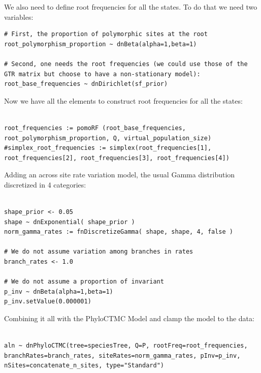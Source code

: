\documentclass[11pt]{article}
\begin{document}
{\begin{framed}
We also need to define root frequencies for all the states.
To do that we need two variables:

 {\tt \begin{snugshade*}
\begin{lstlisting}
# First, the proportion of polymorphic sites at the root
root_polymorphism_proportion ~ dnBeta(alpha=1,beta=1)

# Second, one needs the root frequencies (we could use those of the GTR matrix but choose to have a non-stationary model):
root_base_frequencies ~ dnDirichlet(sf_prior)
\end{lstlisting}
\end{snugshade*}}

Now we have all the elements to construct root frequencies for all the states:
 {\tt \begin{snugshade*}
\begin{lstlisting}

root_frequencies := pomoRF (root_base_frequencies, root_polymorphism_proportion, Q, virtual_population_size)
#simplex_root_frequencies := simplex(root_frequencies[1], root_frequencies[2], root_frequencies[3], root_frequencies[4])

\end{lstlisting}
\end{snugshade*}}

Adding an across site rate variation model, the usual Gamma distribution discretized in 4 categories:
 {\tt \begin{snugshade*}
\begin{lstlisting}

shape_prior <- 0.05 
shape ~ dnExponential( shape_prior )
norm_gamma_rates := fnDiscretizeGamma( shape, shape, 4, false )

# We do not assume variation among branches in rates
branch_rates <- 1.0

# We do not assume a proportion of invariant
p_inv ~ dnBeta(alpha=1,beta=1)
p_inv.setValue(0.000001)
\end{lstlisting}
\end{snugshade*}}

Combining it all with the PhyloCTMC Model and clamp the model to the data:
 {\tt \begin{snugshade*}
\begin{lstlisting}

aln ~ dnPhyloCTMC(tree=speciesTree, Q=P, rootFreq=root_frequencies, branchRates=branch_rates, siteRates=norm_gamma_rates, pInv=p_inv, nSites=concatenate_n_sites, type="Standard")


\end{lstlisting}
\end{snugshade*}}
\end{framed}}
\end{document}
